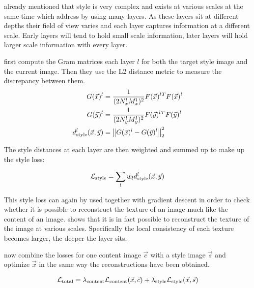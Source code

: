  already mentioned that style is very complex and exists at various scales at the same time which \citeauthor*{gatys} address by using many layers.
As these layers sit at different depths their field of view varies and each layer captures information at a different scale.
Early layers will tend to hold small scale information, later layers will hold larger scale information with every layer.

\citeauthor*{gatys} first compute the Gram matrices each layer $l$ for both the target style image and the current image.
Then they use the L2 distance metric to measure the discrepancy between them.
\begin{align}
    G(\vec{x})^l & = \frac{1}{(2 N_x^l M_x^l)^2} F(\vec{x})^l{}^T F(\vec{x})^l \\
    G(\vec{y})^l & = \frac{1}{(2 N_y^l M_y^l)^2} F(\vec{y})^l{}^T F(\vec{y})^l \\
    d_{\text{style}}^l(\vec{x}, \vec{y}) & = \left\lVert G(\vec{x})^l - G(\vec{y})^l\right\rVert^2_2 \\
\end{align}


The style distances at each layer are then weighted and summed up to make up the style loss:

\begin{align}
    \mathcal{L}_{\text{style}} = \sum_{l} w_l d_{\text{style}}^l(\vec{x}, \vec{y})
\end{align}

This style loss can again by used together with gradient descent in order to check whether it is possible to reconstruct the texture of an image much like the content of an image.
 shows that it is in fact possible to reconstruct the texture of the image at various scales.
Specifically the local consistency of each texture becomes larger, the deeper the layer sits.

\citeauthor*{gatys} now combine the losses for one content image $\vec{c}$ with a style image $\vec{s}$ and optimize $\vec{x}$ in the same way the reconstructions have been obtained.

\begin{align}
    \mathcal{L}_{\text{total}} = \lambda_{\text{content}} \mathcal{L}_{\text{content}}(\vec{x}, \vec{c}) + \lambda_{\text{style}} \mathcal{L}_{\text{style}}(\vec{x}, \vec{s})
\end{align}

